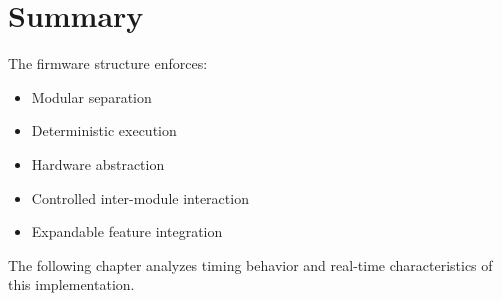 
\section{Summary}

The firmware structure enforces:

\begin{itemize}
	\item Modular separation
	\item Deterministic execution
	\item Hardware abstraction
	\item Controlled inter-module interaction
	\item Expandable feature integration
\end{itemize}

The following chapter analyzes timing behavior and real-time characteristics of this implementation.
